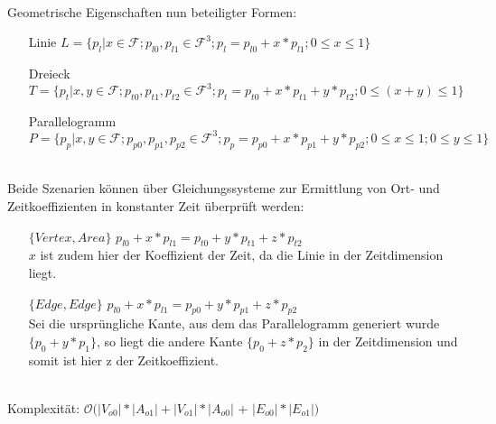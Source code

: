\ \\
		Geometrische Eigenschaften nun beteiligter Formen:
		\begin{itemize}
			\item [Linie] $L = \{p_l | x\in\mathcal{F} ; p_{l0}, p_{l1} \in \mathcal{F}^3 ; p_l = p_{l0} + x * p_{l1}; 0\le x\le 1 \}$
		\item [Dreieck] $T = \{p_t | x,y \in\mathcal{F};  p_{t0},  p_{t1},  p_{t2} \in \mathcal{F}^3; p_t = p_{t0} + x*p_{t1} + y*p_{t2}; 0\le (x+y) \le 1\}$
			\item [Parallelogramm] $P = \{p_p | x,y \in\mathcal{F}; p_{p0}, p_{p1}, p_{p2} \in \mathcal{F}^3; p_p = p_{p0} + x*p_{p1} + y*p_{p2}; 0\le x\le 1; 0\le y\le 1\}$
		\end{itemize}
\ \\
		Beide Szenarien können über Gleichungssysteme zur Ermittlung von Ort- und Zeitkoeffizienten in konstanter Zeit überprüft werden:
		\begin{itemize}
			\item [$\{Vertex, Area\}$] $p_{l0} + x * p_{l1} = p_{t0} + y*p_{t1} + z*p_{t2}$\\
				$x$ ist zudem hier der Koeffizient der Zeit, da die Linie in der Zeitdimension liegt.
			\item [$\{Edge, Edge\}$] $p_{l0} + x * p_{l1} =  p_{p0} + y*p_{p1} + z*p_{p2}$\\
				Sei die ursprüngliche Kante, aus dem das Parallelogramm generiert wurde $\{p_0+y*p_1\}$, so liegt die andere Kante $\{p_0 + z*p_2\}$ in der Zeitdimension und somit ist hier z der Zeitkoeffizient.
		\end{itemize}
\ \\
		Komplexität: $\mathcal{O}(|V_{o0}|* |A_{o1}| + |V_{o1}|*|A_{o0}|$ + $|E_{o0}| * |E_{o1}|)$

